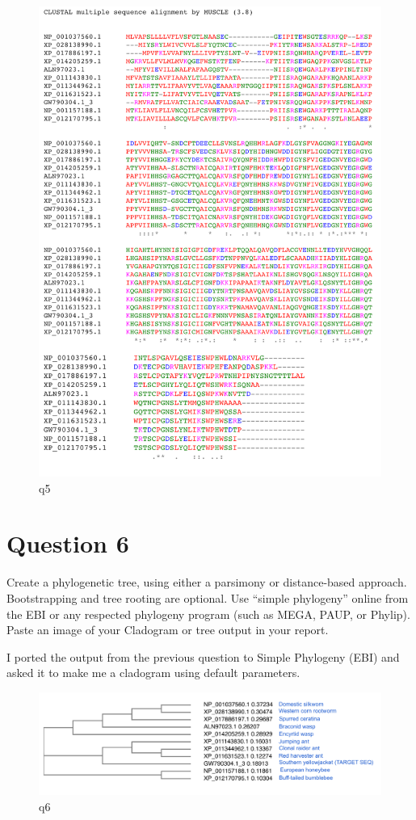 \documentclass[]{article}
\begin{document}
\begin{figure}
\centering
\includegraphics{q5.png}
\caption{q5}
\end{figure}

\section{Question 6}\label{question-6}

Create a phylogenetic tree, using either a parsimony or distance-based
approach. Bootstrapping and tree rooting are optional. Use ``simple
phylogeny'' online from the EBI or any respected phylogeny program (such
as MEGA, PAUP, or Phylip). Paste an image of your Cladogram or tree
output in your report.

I ported the output from the previous question to Simple Phylogeny (EBI)
and asked it to make me a cladogram using default parameters.

\begin{figure}
\centering
\includegraphics{q6_BGGN213_FindAGene_Q6_Cladogram.png}
\caption{q6}
\end{figure}
\end{document}
